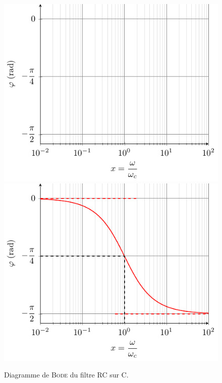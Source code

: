 \documentclass[../../main/main.tex]{subfiles}
\begin{document}
\begin{figure}[htbp!]
{{			\includegraphics[width=\linewidth]{RCC_bode-phase_plain}
		}{
			\includegraphics[width=\linewidth]{RCC_bode-phase}
		}
		\vspace{-15pt}
	}%
	\caption{Diagramme de \textsc{Bode} du filtre RC sur C.}
	\label{fig:rccbode}
\end{figure}
\end{document}
